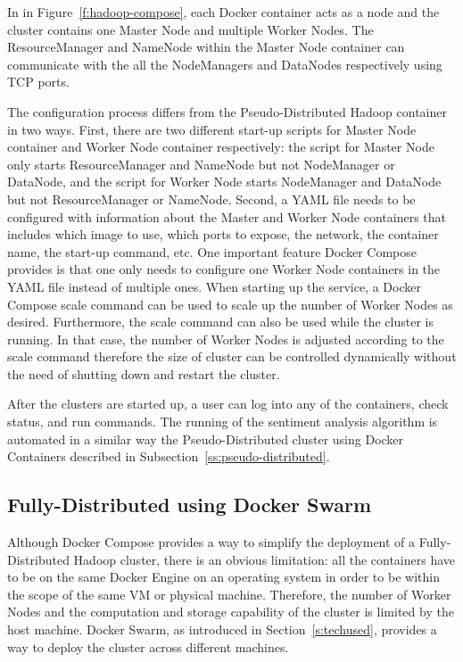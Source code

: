 In in Figure~\ref{f:hadoop-compose}, each Docker container acts as a
node and the cluster contains one Master Node and multiple Worker
Nodes. The ResourceManager and NameNode within the Master Node
container can communicate with the all the NodeManagers and DataNodes
respectively using TCP ports.

The configuration process differs from the Pseudo-Distributed Hadoop
container in two ways. First, there are two different start-up scripts
for Master Node container and Worker Node container respectively: the
script for Master Node only starts ResourceManager and NameNode but
not NodeManager or DataNode, and the script for Worker Node starts
NodeManager and DataNode but not ResourceManager or NameNode. Second,
a YAML file needs to be configured with information about the Master
and Worker Node containers that includes which image to use, which
ports to expose, the network, the container name, the start-up
command, etc. One important feature Docker Compose provides is that
one only needs to configure one Worker Node containers in the YAML
file instead of multiple ones. When starting up the service, a Docker
Compose scale command can be used to scale up the number of Worker
Nodes as desired. Furthermore, the scale command can also be used
while the cluster is running. In that case, the number of Worker Nodes
is adjusted according to the scale command therefore the size of
cluster can be controlled dynamically without the need of shutting
down and restart the cluster.

After the clusters are started up, a user can log into any of the
containers, check status, and run commands. The running of the
sentiment analysis algorithm is automated in a similar way the
Pseudo-Distributed cluster using Docker Containers described in
Subsection~\ref{ss:pseudo-distributed}.


\subsection{Fully-Distributed using Docker Swarm}

Although Docker Compose provides a way to simplify the deployment of a
Fully-Distributed Hadoop cluster, there is an obvious limitation: all
the containers have to be on the same Docker Engine on an operating
system in order to be within the scope of the same VM or physical
machine. Therefore, the number of Worker Nodes and the computation and
storage capability of the cluster is limited by the host
machine. Docker Swarm, as introduced in Section~\ref{s:techused},
provides a way to deploy the cluster across different machines.

